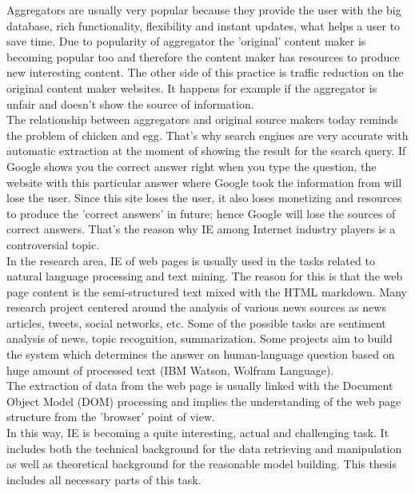 Aggregators are usually very popular because they provide the user with the big database, rich functionality, flexibility and instant updates, what helps a user to save time. Due to popularity of aggregator the 'original' content maker is becoming popular too and therefore the content maker has resources to produce new interesting content. The other side of this practice is traffic reduction on the original content maker websites. It happens for example if the aggregator is unfair and doesn't show the source of information. \\

The relationship between aggregators and original source makers today reminds the problem of chicken and egg. That's why search engines are very accurate with automatic extraction at the moment of showing the result for the search query. If Google shows you the correct answer right when you type the question, the website with this particular answer where Google took the information from will lose the user. Since this site loses the user, it also loses monetizing and resources to produce the 'correct answers' in future; hence Google will lose the sources of correct answers. That's the reason why IE among Internet industry players is a controversial topic.\\

In the research area, IE of web pages is usually used in the tasks related to natural language processing and text mining. The reason for this is that the web page content is the semi-structured text mixed with the HTML markdown. Many research project centered around the analysis of various news sources as news articles, tweets, social networks, etc. Some of the possible tasks are sentiment analysis of news, topic recognition, summarization. Some projects aim to build the system which determines the answer on human-language question based on huge amount of processed text (IBM Watson, Wolfram Language).\\      

The extraction of data from the web page is usually linked with the Document Object Model (DOM) processing and implies the understanding of the web page structure from the 'browser' point of view. \\

In this way, IE is becoming a quite interesting, actual and challenging task. It includes both the technical background for the data retrieving and manipulation as well as theoretical background for the reasonable model building. This thesis includes all necessary parts of this task.

